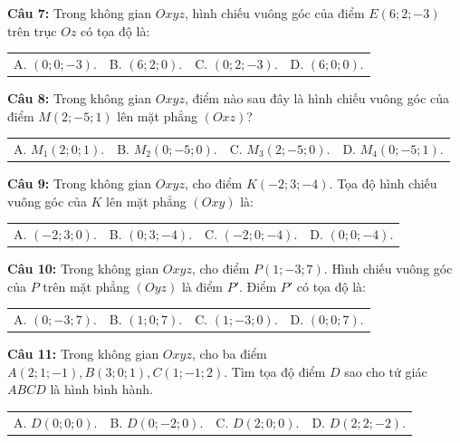 \documentclass[12pt]{article}
\begin{document}
	\vspace{2mm}
	\noindent \textbf{Câu 7:} Trong không gian $Oxyz$, hình chiếu vuông góc của điểm $E(6; 2; -3)$ trên trục $Oz$ có tọa độ là: \\
	\noindent
	\begin{tabular}{p{} p{} p{} p{}}
		A. $(0; 0; -3)$. & B. $(6; 2; 0)$. & C. $(0; 2; -3)$. & D. $(6; 0; 0)$.
	\end{tabular}
	
	\vspace{2mm}
	\noindent \textbf{Câu 8:} Trong không gian $Oxyz$, điểm nào sau đây là hình chiếu vuông góc của điểm $M(2; -5; 1)$ lên mặt phẳng $(Oxz)$? \\
	\noindent
	\begin{tabular}{p{} p{} p{} p{}}
		A. $M_1(2; 0; 1)$. & B. $M_2(0; -5; 0)$. & C. $M_3(2; -5; 0)$. & D. $M_4(0; -5; 1)$.
	\end{tabular}
	
	\vspace{2mm}
	\noindent \textbf{Câu 9:} Trong không gian $Oxyz$, cho điểm $K(-2; 3; -4)$. Tọa độ hình chiếu vuông góc của $K$ lên mặt phẳng $(Oxy)$ là: \\
	\noindent
	\begin{tabular}{p{} p{} p{} p{}}
		A. $(-2; 3; 0)$. & B. $(0; 3; -4)$. & C. $(-2; 0; -4)$. & D. $(0; 0; -4)$.
	\end{tabular}
	
	\vspace{2mm}
	\noindent \textbf{Câu 10:} Trong không gian $Oxyz$, cho điểm $P(1; -3; 7)$. Hình chiếu vuông góc của $P$ trên mặt phẳng $(Oyz)$ là điểm $P'$. Điểm $P'$ có tọa độ là: \\
	\noindent
	\begin{tabular}{p{} p{} p{} p{}}
		A. $(0; -3; 7)$. & B. $(1; 0; 7)$. & C. $(1; -3; 0)$. & D. $(0; 0; 7)$.
	\end{tabular}
	\noindent \textbf{Câu 11:} Trong không gian $Oxyz$, cho ba điểm $A(2; 1; -1), B(3; 0; 1), C(1; -1; 2)$. Tìm tọa độ điểm $D$ sao cho tứ giác $ABCD$ là hình bình hành. \\
	\noindent
	\begin{tabular}{p{} p{} p{} p{}}
		A. $D(0; 0; 0)$. & B. $D(0; -2; 0)$. & C. $D(2; 0; 0)$. & D. $D(2; 2; -2)$.
	\end{tabular}
	
\end{document}
